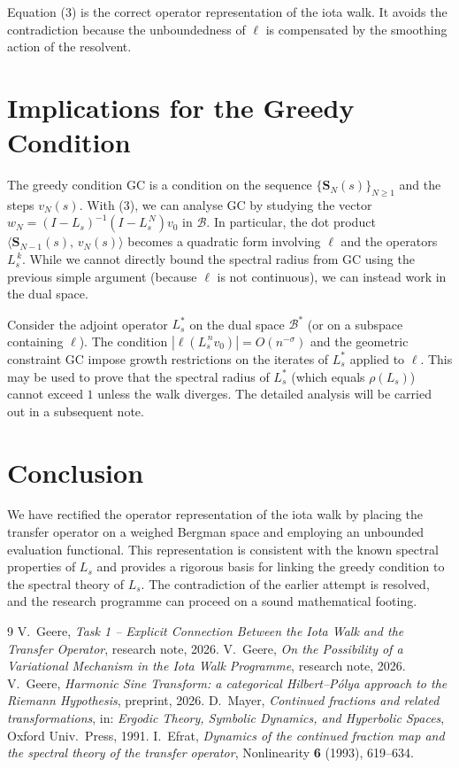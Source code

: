\documentclass[11pt,a4paper]{article}
\begin{document}
Equation (3) is the correct operator representation of the iota walk.  It avoids the contradiction because the unboundedness of \(\ell\) is compensated by the smoothing action of the resolvent.

\section{Implications for the Greedy Condition}
The greedy condition GC is a condition on the sequence \(\{\mathbf{S}_N(s)\}_{N\ge 1}\) and the steps \(v_N(s)\).  With (3), we can analyse GC by studying the vector \(w_N = (I - L_s)^{-1}(I - L_s^{\,N}) v_0\) in \(\mathcal{B}\).  In particular, the dot product \(\langle \mathbf{S}_{N-1}(s),\, v_N(s)\rangle\) becomes a quadratic form involving \(\ell\) and the operators \(L_s^{\,k}\).  While we cannot directly bound the spectral radius from GC using the previous simple argument (because \(\ell\) is not continuous), we can instead work in the dual space.

Consider the adjoint operator \(L_s^*\) on the dual space \(\mathcal{B}^*\) (or on a subspace containing \(\ell\)).  The condition \(|\ell(L_s^{\,n} v_0)| = O(n^{-\sigma})\) and the geometric constraint GC impose growth restrictions on the iterates of \(L_s^*\) applied to \(\ell\).  This may be used to prove that the spectral radius of \(L_s^*\) (which equals \(\rho(L_s)\)) cannot exceed \(1\) unless the walk diverges.  The detailed analysis will be carried out in a subsequent note.

\section{Conclusion}
We have rectified the operator representation of the iota walk by placing the transfer operator on a weighed Bergman space and employing an unbounded evaluation functional.  This representation is consistent with the known spectral properties of \(L_s\) and provides a rigorous basis for linking the greedy condition to the spectral theory of \(L_s\).  The contradiction of the earlier attempt is resolved, and the research programme can proceed on a sound mathematical footing.

\begin{thebibliography}{9}
 V.\ Geere, \emph{Task 1 -- Explicit Connection Between the Iota Walk and the Transfer Operator}, research note, 2026.
 V.\ Geere, \emph{On the Possibility of a Variational Mechanism in the Iota Walk Programme}, research note, 2026.
 V.\ Geere, \emph{Harmonic Sine Transform: a categorical Hilbert--Pólya approach to the Riemann Hypothesis}, preprint, 2026.
 D.\ Mayer, \emph{Continued fractions and related transformations}, in: \textit{Ergodic Theory, Symbolic Dynamics, and Hyperbolic Spaces}, Oxford Univ.\ Press, 1991.
 I.\ Efrat, \emph{Dynamics of the continued fraction map and the spectral theory of the transfer operator}, Nonlinearity \textbf{6} (1993), 619--634.
\end{thebibliography}
\end{document}
